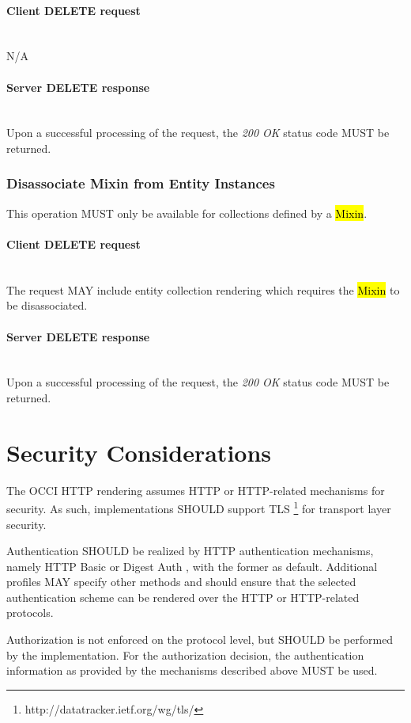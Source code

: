 \documentclass[10pt,a4paper]{article}
\begin{document}
\paragraph*{Client DELETE request}\hfill\\
N/A

\paragraph*{Server DELETE response}\hfill\\
Upon a successful processing of the request, the \emph{200 OK} status code MUST be returned.

\subsubsection{Disassociate Mixin from Entity Instances}
This operation MUST only be available for collections defined by a \hl{Mixin}.

\paragraph*{Client DELETE request}\hfill\\
The request MAY include entity collection rendering which requires the \hl{Mixin} to be disassociated.

\paragraph*{Server DELETE response}\hfill\\
Upon a successful processing of the request, the \emph{200 OK} status code MUST be returned.

\section{Security Considerations}
\label{sec:sec_consid}
The OCCI HTTP rendering assumes HTTP or HTTP-related mechanisms for
security. As such, implementations SHOULD support
TLS \footnote{http://datatracker.ietf.org/wg/tls/} for transport layer
security.

Authentication SHOULD be realized by HTTP authentication mechanisms,
namely HTTP Basic or Digest Auth \cite{rfc2617}, with the former as
default. Additional profiles MAY specify other methods and should
ensure that the selected authentication scheme can be rendered over
the HTTP or HTTP-related protocols.

Authorization is not enforced on the protocol level, but SHOULD be
performed by the implementation. For the authorization decision, the
authentication information as provided by the mechanisms described
above MUST be used.
\end{document}
